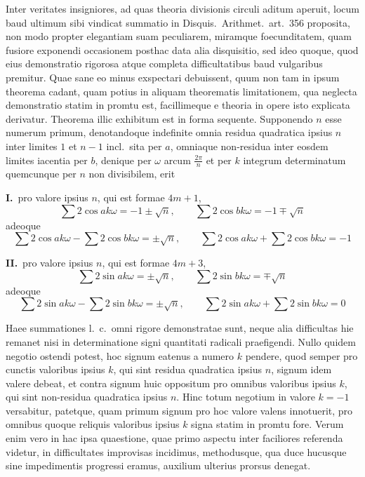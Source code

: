 \documentclass[12pt,a4paper]{article}
\theoremstyle{plain}
\begin{document}
Inter veritates insigniores, ad quas theoria divisionis circuli aditum aperuit, locum baud ultimum sibi vindicat summatio in Disquis.\ Arithmet.\ art.\ 356 proposita, non modo propter elegantiam suam peculiarem, miramque foecunditatem, quam fusiore exponendi occasionem posthac data alia disquisitio, sed ideo quoque, quod eius demonstratio rigorosa atque completa difficultatibus baud vulgaribus premitur. Quae sane eo minus exspectari debuissent, quum non tam in ipsum theorema cadant, quam potius in aliquam theorematis limitationem, qua neglecta demonstratio statim in promtu est, facillimeque e theoria in opere isto explicata derivatur. Theorema illic exhibitum est in forma sequente. Supponendo $n$ esse numerum primum, denotandoque indefinite omnia residua quadratica ipsius $n$ inter limites $1$ et $n-1$ incl.\ sita per $a$, omniaque non-residua inter eosdem limites iacentia per $b$, denique per $\omega$ arcum $\frac{2\pi}{n}$ et per $k$ integrum determinatum quemcunque per $n$ non divisibilem, erit

\medskip
\noindent\textbf{I.}\ pro valore ipsius $n$, qui est formae $4m+1$,
\[
\sum 2\cos ak\omega = -1 \pm \sqrt{n}, \qquad \sum 2\cos bk\omega = -1 \mp \sqrt{n}
\]
adeoque
\[
\sum 2\cos ak\omega - \sum 2\cos bk\omega = \pm \sqrt{n}, \qquad \sum 2\cos ak\omega + \sum 2\cos bk\omega = -1
\]

\medskip
\noindent\textbf{II.}\ pro valore ipsius $n$, qui est formae $4m+3$,
\[
\sum 2\sin ak\omega = \pm \sqrt{n}, \qquad \sum 2\sin bk\omega = \mp \sqrt{n}
\]
adeoque
\[
\sum 2\sin ak\omega - \sum 2\sin bk\omega = \pm \sqrt{n}, \qquad \sum 2\sin ak\omega + \sum 2\sin bk\omega = 0
\]

\medskip
\noindent Haee summationes l.\ c.\ omni rigore demonstratae sunt, neque alia difficultas hie remanet nisi in determinatione signi quantitati radicali praefigendi. Nullo quidem negotio ostendi potest, hoc signum eatenus a numero $k$ pendere, quod semper pro cunctis valoribus ipsius $k$, qui sint residua quadratica ipsius $n$, signum idem valere debeat, et contra signum huic oppositum pro omnibus valoribus ipsius $k$, qui sint non-residua quadratica ipsius $n$. Hinc totum negotium in valore $k = -1$ versabitur, patetque, quam primum signum pro hoc valore valens innotuerit, pro omnibus quoque reliquis valoribus ipsius $k$ signa statim in promtu fore. Verum enim vero in hac ipsa quaestione, quae primo aspectu inter faciliores referenda videtur, in difficultates improvisas incidimus, methodusque, qua duce hucusque sine impedimentis progressi eramus, auxilium ulterius prorsus denegat.
\end{document}

